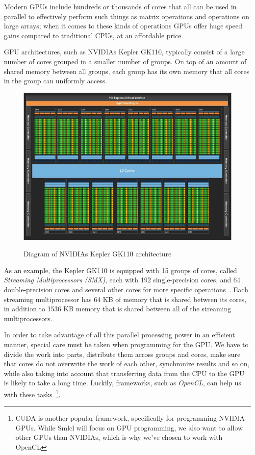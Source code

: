 Modern GPUs include hundreds or thousands of cores that all can be
used in parallel to effectively perform such things as matrix
operations and operations on large arrays; when it comes to these
kinds of operations GPUs offer huge speed gains compared to
traditional CPUs, at an affordable price.

GPU architectures, such as NVIDIAs Kepler GK110, typically consist of
a large number of cores grouped in a smaller number of groups. On top
of an amount of shared memory between all groups, each group has its
own memory that all cores in the group can uniformly access.

\begin{figure}
  \centering
  \caption{Diagram of NVIDIAs Kepler GK110 architecture}
  \includegraphics[width=1\textwidth]{figures/kepler110.png}
  \label{kepler}
\end{figure}

As an example, the Kepler GK110 is equipped with 15 groups of cores,
called \emph{Streaming Multiprocessors (SMX)}, each with 192
single-precision cores, and 64 double-precision cores and several
other cores for more specific operations~\cite{kepler}. Each streaming
multiprocessor has 64 KB of memory that is shared between its cores,
in addition to 1536 KB memory that is shared between all of the
streaming multiprocessors.

In order to take advantage of all this parallel processing power in an
efficient manner, special care must be taken when programming for the
GPU. We have to divide the work into parts, distribute them across
groups and cores, make sure that cores do not overwrite the work of
each other, synchronize results and so on, while also taking into
account that transferring data from the CPU to the GPU is likely to
take a long time. Luckily, frameworks, such as \emph{OpenCL}, can help
us with these tasks~\footnote{CUDA is another popular framework,
  specifically for programming NVIDIA GPUs. While Smlcl will focus on
  GPU programming, we also want to allow other GPUs than NVIDIAs,
  which is why we've chosen to work with OpenCL}.

